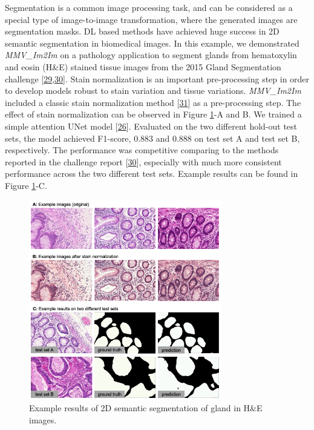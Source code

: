 Segmentation is a common image processing task, and can be considered as a special type of image-to-image transformation, where the generated images are segmentation masks. DL based methods have achieved huge success in 2D semantic segmentation in biomedical images. In this example, we demonstrated \emph{MMV\_Im2Im} on a pathology application to segment glands from hematoxylin and eosin (H\&E) stained tissue images from the 2015 Gland Segmentation challenge {[}\protect\hyperlink{ref-45Sirz1X}{29},\protect\hyperlink{ref-XAffSYIR}{30}{]}. Stain normalization is an important pre-processing step in order to develop models robust to stain variation and tissue variations. \emph{MMV\_Im2Im} included a classic stain normalization method {[}\protect\hyperlink{ref-tQhnZyjK}{31}{]} as a pre-processing step. The effect of stain normalization can be observed in Figure \ref{fig:2d_gland}-A and B. We trained a simple attention UNet model {[}\protect\hyperlink{ref-OCow1hly}{26}{]}. Evaluated on the two different hold-out test sets, the model achieved F1-score, 0.883 and 0.888 on test set A and test set B, respectively. The performance was competitive comparing to the methods reported in the challenge report {[}\protect\hyperlink{ref-XAffSYIR}{30}{]}, especially with much more consistent performance across the two different test sets. Example results can be found in Figure \ref{fig:2d_gland}-C.

\begin{figure}
\hypertarget{fig:2d_gland}{%
\centering
\includegraphics[width=0.75\textwidth,height=\textheight]{images/gland.png}
\caption{Example results of 2D semantic segmentation of gland in H\&E images.}\label{fig:2d_gland}
}
\end{figure}

